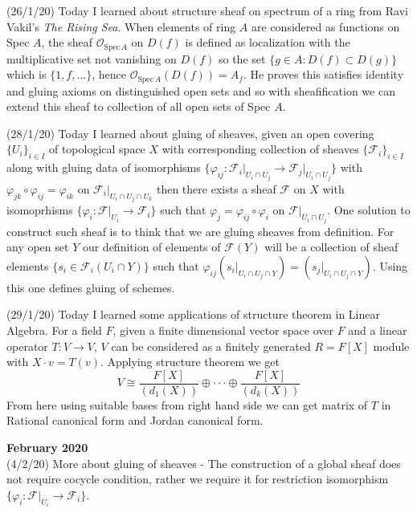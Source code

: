 \documentclass[12pt,a4paper]{article}
\begin{document}
(26/1/20) Today I learned about structure sheaf on spectrum of a ring from Ravi Vakil's \textit{The Rising Sea}. When elements of ring $A$ are considered as functions on Spec $A$, the sheaf $\mathcal{O}_{\text{Spec} \, A}$ on $D(f)$ is defined as localization with the multiplicative set not vanishing on $D(f)$ so the set $\{ g\in A : D(f) \subset D(g)\}$ which is $\{1,f,...\}$, hence $\mathcal{O}_{\text{Spec} \, A}(D(f))=A_f$. He proves this satisfies identity and gluing axioms on distinguished open sets and so with sheafification we can extend this sheaf to collection of all open sets of Spec $A$.

(28/1/20) Today I learned about gluing of sheaves, given an open covering $\{U_i\}_{i\in I}$ of topological space $X$ with corresponding collection of sheaves $\{\mathcal{F}_i\}_{i \in I}$ along with gluing data of isomorphisms $\{\varphi_{ij} : \mathcal{F}_i\vert_{U_i \cap U_j} \to \mathcal{F}_j\vert_{U_i \cap U_j} \}$ with $\varphi_{jk} \circ \varphi_{ij} = \varphi_{ik}$ on $\mathcal{F}_i\vert_{U_i \cap U_j \cap U_k}$ then there exists a sheaf $\mathcal{F}$ on $X$ with isomoprhisms $\{\varphi_i :  \mathcal{F}\vert_{U_i} \to \mathcal{F}_i\}$ such that $\varphi_j = \varphi_{ij} \circ \varphi_i$ on $\mathcal{F}\vert_{U_i \cap U_j}$. One solution to construct such sheaf is to think that we are gluing sheaves from definition. For any open set $Y$ our definition of elements of $\mathcal{F}(Y)$ will be a collection of sheaf elements $\{s_i \in \mathcal{F}_i(U_i\cap Y)\}$ such that $\varphi_{ij} (s_i\vert_{U_i\cap U_j \cap Y})= (s_j\vert_{U_i\cap U_j \cap Y})$. Using this one defines gluing of schemes.

(29/1/20) Today I learned some applications of structure theorem in Linear Algebra. For a field $F$, given a finite dimensional vector space over $F$ and a linear operator $T : V \to V$, $V$ can be considered as a finitely generated $R=F[X]$ module with $X\cdot v=T(v)$. Applying structure theorem we get \[ V \cong \frac{F[X]}{(d_1(X))} \oplus \cdot \cdot\cdot \oplus \frac{F[X]}{(d_k(X))} \] From here using suitable bases from right hand side we can get matrix of $T$ in Rational canonical form and Jordan canonical form.
\\

\maketitle\textbf{February 2020}
\\

(4/2/20) More about gluing of sheaves - The construction of a global sheaf does not require cocycle condition, rather we require it for restriction isomorphism $\{\varphi_i :  \mathcal{F}\vert_{U_i} \to \mathcal{F}_i\}$.
\end{document}

